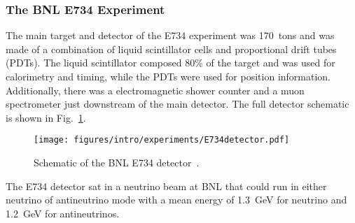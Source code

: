   \subsubsection{The BNL E734 Experiment}\label{sec:e734}
  The main target and detector of the E734 experiment was 170~tons and was
  made of a combination of liquid scintillator cells and proportional drift
  tubes (PDTs). The liquid scintillator composed 80\% of the target and was
  used for calorimetry and timing, while the PDTs were used for position
  information. Additionally, there was a electromagnetic shower counter and a
  muon spectrometer just downstream of the main detector. The full detector
  schematic is shown in Fig.~\ref{fig:e734detector}.
  \begin{figure}[h]
    \centering
    \texttt{[image: figures/intro/experiments/E734detector.pdf]}
    \caption{Schematic of the BNL E734 detector~\cite{Ahrens:1986xe}.}
    \label{fig:e734detector}
  \end{figure}
  The E734 detector sat in a neutrino beam at BNL that could run in either
  neutrino of antineutrino mode with a mean energy of 1.3~GeV for neutrino
  and 1.2~GeV for antineutrinos.

